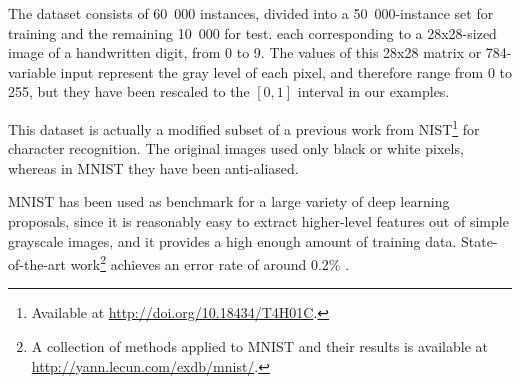 \documentclass[preprint,5p,compress]{elsarticle}
\begin{document}
The dataset consists of 60~000 instances, divided into a 50~000-instance set for training and the remaining 10~000 for test. each corresponding to a 28x28-sized image of a handwritten digit, from 0 to 9. The values of this 28x28 matrix or 784-variable input represent the gray level of each pixel, and therefore range from 0 to 255, but they have been rescaled to the $[0,1]$ interval in our examples.

This dataset is actually a modified subset of a previous work from NIST\footnote{Available at \url{http://doi.org/10.18434/T4H01C}.} for character recognition. The original images used only black or white pixels, whereas in MNIST they have been anti-aliased.

MNIST has been used as benchmark for a large variety of deep learning proposals, since it is reasonably easy to extract higher-level features out of simple grayscale images, and it provides a high enough amount of training data. State-of-the-art work\footnote{A collection of methods applied to MNIST and their results is available at \url{http://yann.lecun.com/exdb/mnist/}.} achieves an error rate of around 0.2\% \cite{Alvear_Sandoval_2018,MulticolumnDNN}.
\end{document}
